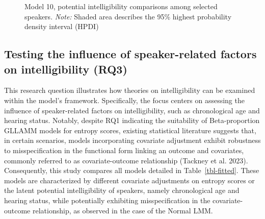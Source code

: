 \documentclass[
sn-apacite
]{sn-jnl}
\begin{document}
\label{cell-fig-si_contr_model10}
\begin{figure}[H]


\caption{\label{fig-si_contr_model10}Model 10, potential intelligibility
comparisons among selected speakers. \emph{Note:} Shaded area describes
the 95\% highest probability density interval (HPDI)}

\end{figure}%

\subsection{Testing the influence of speaker-related factors on
intelligibility (RQ3)}\label{sec-R-RQ3}

This research question illustrates how theories on intelligibility can
be examined within the model's framework. Specifically, the focus
centers on assessing the influence of speaker-related factors on
intelligibility, such as chronological age and hearing status. Notably,
despite RQ1 indicating the suitability of Beta-proportion GLLAMM models
for entropy scores, existing statistical literature suggests that, in
certain scenarios, models incorporating covariate adjustment exhibit
robustness to misspecification in the functional form linking an outcome
and covariates, commonly referred to as covariate-outcome relationship
(Tackney et al. 2023). Consequently, this study compares all models
detailed in Table~\ref{tbl-fitted}. These models are characterized by
different covariate adjustments on entropy scores or the latent
potential intelligibility of speakers, namely chronological age and
hearing status, while potentially exhibiting misspecification in the
covariate-outcome relationship, as observed in the case of the Normal
LMM.
\end{document}
